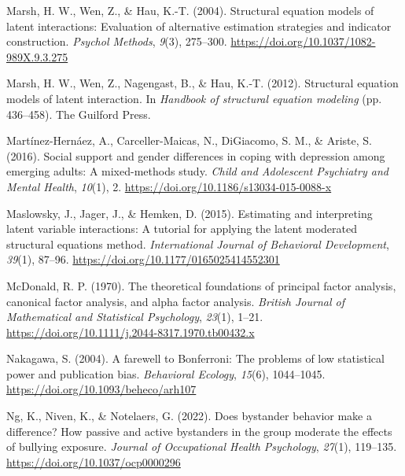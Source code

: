\documentclass[
  man]{apa7}
\newlength{\cslhangindent}
\newlength{\cslentryspacingunit} %
\newenvironment{CSLReferences}[2] %
 {%
  \setlength{\parindent}{0pt}
  \ifodd #1
  \let\oldpar\par
  \def\par{\hangindent=\cslhangindent\oldpar}
  \fi
  \setlength{\parskip}{#2\cslentryspacingunit}
 }%
 {}
\begin{document}
\begin{CSLReferences}{1}{0}
\leavevmode{}%
Marsh, H. W., Wen, Z., \& Hau, K.-T. (2004). Structural equation models of latent interactions: Evaluation of alternative estimation strategies and indicator construction. \emph{Psychol Methods}, \emph{9}(3), 275--300. \url{https://doi.org/10.1037/1082-989X.9.3.275}

\leavevmode{}%
Marsh, H. W., Wen, Z., Nagengast, B., \& Hau, K.-T. (2012). Structural equation models of latent interaction. In \emph{Handbook of structural equation modeling} (pp. 436--458). The Guilford Press.

\leavevmode{}%
Martínez-Hernáez, A., Carceller-Maicas, N., DiGiacomo, S. M., \& Ariste, S. (2016). Social support and gender differences in coping with depression among emerging adults: A mixed-methods study. \emph{Child and Adolescent Psychiatry and Mental Health}, \emph{10}(1), 2. \url{https://doi.org/10.1186/s13034-015-0088-x}

\leavevmode{}%
Maslowsky, J., Jager, J., \& Hemken, D. (2015). Estimating and interpreting latent variable interactions: {A} tutorial for applying the latent moderated structural equations method. \emph{International Journal of Behavioral Development}, \emph{39}(1), 87--96. \url{https://doi.org/10.1177/0165025414552301}

\leavevmode{}%
McDonald, R. P. (1970). The theoretical foundations of principal factor analysis, canonical factor analysis, and alpha factor analysis. \emph{British Journal of Mathematical and Statistical Psychology}, \emph{23}(1), 1--21. \url{https://doi.org/10.1111/j.2044-8317.1970.tb00432.x}

\leavevmode{}%
Nakagawa, S. (2004). A farewell to {Bonferroni}: {The} problems of low statistical power and publication bias. \emph{Behavioral Ecology}, \emph{15}(6), 1044--1045. \url{https://doi.org/10.1093/beheco/arh107}

\leavevmode{}%
Ng, K., Niven, K., \& Notelaers, G. (2022). Does bystander behavior make a difference? {How} passive and active bystanders in the group moderate the effects of bullying exposure. \emph{Journal of Occupational Health Psychology}, \emph{27}(1), 119--135. \url{https://doi.org/10.1037/ocp0000296}


\end{CSLReferences}
\end{document}
